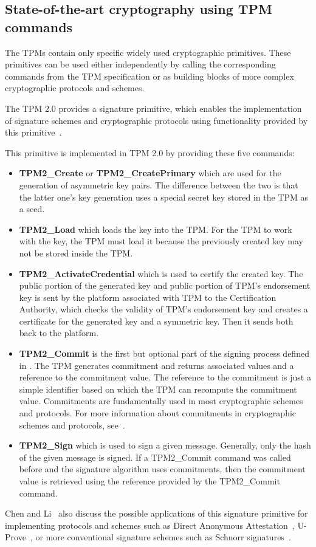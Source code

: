 \subsection{State-of-the-art cryptography using TPM commands}\label{sec:soacryptotpmcommands}
The TPMs contain only specific widely used cryptographic primitives. These primitives can be used either independently by calling the corresponding commands from the TPM specification or as building blocks of more complex cryptographic protocols and schemes.

The TPM 2.0 provides a signature primitive, which enables the implementation of signature schemes and cryptographic protocols using functionality provided by this primitive~\cite{chen2013flexible}. 

This primitive is implemented in TPM 2.0 by providing these five commands:
\begin{itemize}
    \item \textbf{TPM2\_Create} or \textbf{TPM2\_CreatePrimary} which are used for the generation of asymmetric key pairs. The difference between the two is that the latter one's key generation uses a special secret key stored in the TPM as a seed.
    \item \textbf{TPM2\_Load} which loads the key into the TPM. For the TPM to work with the key, the TPM must load it because the previously created key may not be stored inside the TPM.
    \item \textbf{TPM2\_ActivateCredential} which is used to certify the created key. The public portion of the generated key and public portion of TPM's endorsement key is sent by the platform associated with TPM to the Certification Authority, which checks the validity of TPM's endorsement key and creates a certificate for the generated key and a symmetric key. Then it sends both back to the platform.
    \item \textbf{TPM2\_Commit} is the first but optional part of the signing process defined in \cite{chen2013flexible}. The TPM generates commitment and returns associated values and a reference to the commitment value. The reference to the commitment is just a simple identifier based on which the TPM can recompute the commitment value. Commitments are fundamentally used in most cryptographic schemes and protocols. For more information about commitments in cryptographic schemes and protocols, see~\cite{damgaard1998commitment}. 
    \item \textbf{TPM2\_Sign} which is used to sign a given message. Generally, only the hash of the given message is signed. If a TPM2\_Commit command was called before and the signature algorithm uses commitments, then the commitment value is retrieved using the reference provided by the TPM2\_Commit command.
\end{itemize}
Chen and Li~\cite{chen2013flexible} also discuss the possible applications of this signature primitive for implementing protocols and schemes such as Direct Anonymous Attestation~\cite{daaSpec}, U-Prove~\cite{uproveSpec}, or more conventional signature schemes such as Schnorr signatures~\cite{schnorrSpec}. 

